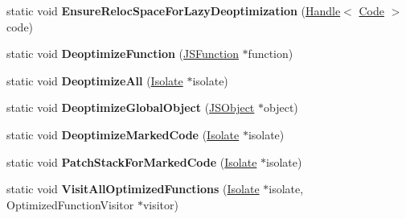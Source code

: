 \begin{DoxyCompactItemize}
\item 
\hypertarget{classv8_1_1internal_1_1_deoptimizer_a24bf34f5595b88f37234a55fdb4491a3}{}static void {\bfseries Ensure\+Reloc\+Space\+For\+Lazy\+Deoptimization} (\hyperlink{classv8_1_1internal_1_1_handle}{Handle}$<$ \hyperlink{classv8_1_1internal_1_1_code}{Code} $>$ code)\label{classv8_1_1internal_1_1_deoptimizer_a24bf34f5595b88f37234a55fdb4491a3}

\item 
\hypertarget{classv8_1_1internal_1_1_deoptimizer_a37eeae721317de053d14471471235308}{}static void {\bfseries Deoptimize\+Function} (\hyperlink{classv8_1_1internal_1_1_j_s_function}{J\+S\+Function} $\ast$function)\label{classv8_1_1internal_1_1_deoptimizer_a37eeae721317de053d14471471235308}

\item 
\hypertarget{classv8_1_1internal_1_1_deoptimizer_a6bb35276c37391b101bba2759894c2d0}{}static void {\bfseries Deoptimize\+All} (\hyperlink{classv8_1_1internal_1_1_isolate}{Isolate} $\ast$isolate)\label{classv8_1_1internal_1_1_deoptimizer_a6bb35276c37391b101bba2759894c2d0}

\item 
\hypertarget{classv8_1_1internal_1_1_deoptimizer_a58cf995255d734234820c8c5e8dc6fea}{}static void {\bfseries Deoptimize\+Global\+Object} (\hyperlink{classv8_1_1internal_1_1_j_s_object}{J\+S\+Object} $\ast$object)\label{classv8_1_1internal_1_1_deoptimizer_a58cf995255d734234820c8c5e8dc6fea}

\item 
\hypertarget{classv8_1_1internal_1_1_deoptimizer_a7cbb81963c0529cc90612511d408db06}{}static void {\bfseries Deoptimize\+Marked\+Code} (\hyperlink{classv8_1_1internal_1_1_isolate}{Isolate} $\ast$isolate)\label{classv8_1_1internal_1_1_deoptimizer_a7cbb81963c0529cc90612511d408db06}

\item 
\hypertarget{classv8_1_1internal_1_1_deoptimizer_abdc9ab961cae11eb8ce635a012781233}{}static void {\bfseries Patch\+Stack\+For\+Marked\+Code} (\hyperlink{classv8_1_1internal_1_1_isolate}{Isolate} $\ast$isolate)\label{classv8_1_1internal_1_1_deoptimizer_abdc9ab961cae11eb8ce635a012781233}

\item 
\hypertarget{classv8_1_1internal_1_1_deoptimizer_a6576089abc90944777e264ecb983dcce}{}static void {\bfseries Visit\+All\+Optimized\+Functions} (\hyperlink{classv8_1_1internal_1_1_isolate}{Isolate} $\ast$isolate, Optimized\+Function\+Visitor $\ast$visitor)\label{classv8_1_1internal_1_1_deoptimizer_a6576089abc90944777e264ecb983dcce}


\end{DoxyCompactItemize}
